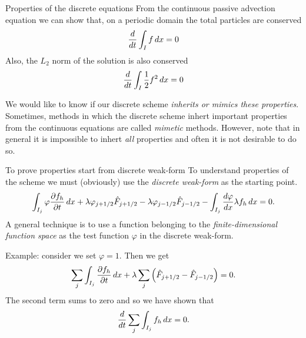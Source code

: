 \documentclass[aspectratio=169]{beamer}
\newcommand{\mypause}{}
\newcommand{\pfrac}[2]{\frac{\partial #1}{\partial #2}}
\begin{document}
\begin{frame}{Properties of the discrete equations}
  From the continuous passive advection equation we can show that, on
  a periodic domain the total particles are conserved
  \begin{align*}
    \frac{d}{dt}\int_I f \thinspace dx = 0
  \end{align*}
  Also, the $L_2$ norm of the solution is also conserved
  \begin{align*}
    \frac{d}{dt}\int_I \frac{1}{2} f^2 \thinspace dx = 0
  \end{align*}  

  We would like to know if our discrete scheme \emph{inherits or
    mimics these properties}. Sometimes, methods in which the discrete
  scheme inhert important properties from the continuous equations are
  called \emph{mimetic} methods. However, note that in general it is
  impossible to inhert \emph{all} properties and often it is not
  desirable to do so.
  
\end{frame}


\begin{frame}{To prove properties start from discrete weak-form}
  \footnotesize
  To understand properties of the scheme we must (obviously) use the
  \emph{discrete weak-form} as the starting point.
  \begin{align*}
    \int_{I_j} \varphi \pfrac{f_h}{t}\thinspace dx
    +
    \lambda \varphi_{j+1/2}\hat{F}_{j+1/2} - \lambda \varphi_{j-1/2}\hat{F}_{j-1/2}
    -
    \int_{I_j}  \frac{d\varphi}{dx}\lambda f_h\thinspace dx = 0.
  \end{align*}
  A general technique is to use a function belonging to the
  \emph{finite-dimensional function space} as the test function
  $\varphi$ in the discrete weak-form.
  \mypause%

  Example: consider we set $\varphi = 1$. Then we get
  \begin{align*}
    \sum_j \int_{I_j} \pfrac{f_h}{t}\thinspace dx
    +
    \lambda \sum_j \left(
    \hat{F}_{j+1/2} - \hat{F}_{j-1/2}
    \right) = 0.
  \end{align*}
  The second term sums to zero and so we have shown that
  \begin{align*}
    \frac{d}{dt}\sum_j \int_{I_j} f_h\thinspace dx = 0.
  \end{align*}  
\end{frame}
\end{document}
